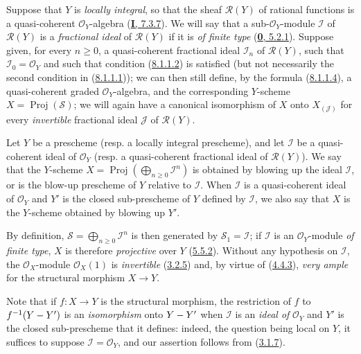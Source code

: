 \begin{env}[8.1.2]
\label{II.8.1.2}
Suppose that $Y$ is \emph{locally integral}, so that the sheaf
$\mathcal{R}(Y)$ of rational functions is a quasi-coherent $\mathcal{O}_Y$-algebra
(\hyperref[I.7.3.7]{\textbf{I}, 7.3.7}). We will say that a
sub-$\mathcal{O}_Y$-module $\mathcal{I}$ of $\mathcal{R}(Y)$ is a
\emph{fractional ideal} of $\mathcal{R}(Y)$ if it is \emph{of finite type}
(\hyperref[0.5.2.1]{\textbf{0}, 5.2.1}). Suppose given, for every $n\geq0$, a
quasi-coherent fractional ideal $\mathcal{I}_n$ of $\mathcal{R}(Y)$, such
that $\mathcal{I}_0=\mathcal{O}_Y$ and such that condition
(\hyperref[II.8.1.1.2]{8.1.1.2}) is satisfied (but not necessarily the
second condition in (\hyperref[II.8.1.1.1]{8.1.1.1})); we can then still
define, by the formula (\hyperref[II.8.1.1.4]{8.1.1.4}), a quasi-coherent
graded $\mathcal{O}_Y$-algebra, and the corresponding $Y$-scheme
$X=\operatorname{Proj}(\mathcal{S})$; we will again have a canonical
isomorphism of $X$ onto $X_{(\mathcal{J})}$ for every \emph{invertible} fractional
ideal $\mathcal{J}$ of $\mathcal{R}(Y)$.
\end{env}

\begin{definition}[8.1.3]
\label{II.8.1.3}
Let $Y$ be a prescheme \textup{(resp.} a locally integral prescheme), and let
$\mathcal{I}$ be a quasi-coherent ideal of $\mathcal{O}_Y$ \textup{(resp.} a quasi-coherent
fractional ideal of $\mathcal{R}(Y)$). We say that the $Y$-scheme
$X=\operatorname{Proj}(\bigoplus_{n\geq0}\mathcal{I}^n)$ is obtained by
blowing up the ideal $\mathcal{I}$, or is the blow-up prescheme
of $Y$ relative to $\mathcal{I}$. When $\mathcal{I}$ is a
quasi-coherent ideal of $\mathcal{O}_Y$ and $Y'$ is the closed sub-prescheme of $Y$
defined by $\mathcal{I}$, we also say that $X$ is the $Y$-scheme obtained by
blowing up $Y'$.
\end{definition}

By definition, $\mathcal{S}=\bigoplus_{n\geq0}\mathcal{I}^n$ is then
generated by $\mathcal{S}_1=\mathcal{I}$; if $\mathcal{I}$ is an
$\mathcal{O}_Y$-module \emph{of finite type}, $X$ is therefore \emph{projective} over
$Y$ (\hyperref[II.5.5.2]{5.5.2}). Without any hypothesis on $\mathcal{I}$, the
$\mathcal{O}_X$-module $\mathcal{O}_X(1)$ is \emph{invertible}
(\hyperref[II.3.2.5]{3.2.5}) and, by virtue of
(\hyperref[II.4.4.3]{4.4.3}), \emph{very ample} for the structural morphism $X\to Y$.

Note that if $f:X\to Y$ is the structural morphism, the restriction of
$f$ to $f^{-1}(Y- Y')$ is an \emph{isomorphism} onto $Y- Y'$ when
$\mathcal{I}$ is an \emph{ideal of} $\mathcal{O}_Y$ and $Y'$ is the closed sub-prescheme
that it defines: indeed, the question being local on $Y$, it suffices to
suppose $\mathcal{I}=\mathcal{O}_Y$, and our assertion follows from
(\hyperref[II.3.1.7]{3.1.7}).

